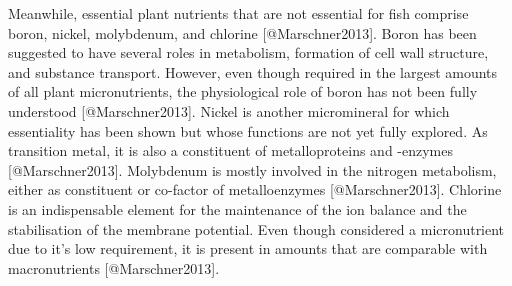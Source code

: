 Meanwhile, essential plant nutrients that are not essential for fish comprise boron, nickel, molybdenum, and chlorine [@Marschner2013].
Boron has been suggested to have several roles in metabolism, formation of cell wall structure, and substance transport. However, even though required in the largest amounts of all plant micronutrients, the physiological role of boron has not been fully understood [@Marschner2013]. Nickel is another micromineral for which essentiality has been shown but whose functions are not yet fully explored. As transition metal, it is also a constituent of metalloproteins and -enzymes [@Marschner2013]. Molybdenum is mostly involved in the nitrogen metabolism, either as constituent or co-factor of metalloenzymes [@Marschner2013].
Chlorine is an indispensable element for the maintenance of the ion balance and the stabilisation of the membrane potential. Even though considered a micronutrient due to it's low requirement, it is present in amounts that are comparable with macronutrients [@Marschner2013].